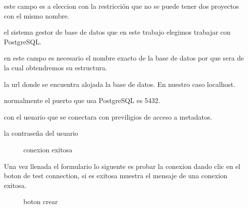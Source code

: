 \begin{description}[align=left]
\item [Nombre] este campo es a eleccion con la restricci\'on que no se puede tener dos proyectos con el mismo nombre.
\item [sgbd] el sistema gestor de base de datos que en este trabajo elegimos trabajar con PostgreSQL.
\item [base de datos] en este campo es necesario el nombre exacto de la base de datos por que sera de la cual obtendremos su estructura.
\item [host] la url donde se encuentra alojada la base de datos. En nuestro caso localhost.
\item [puerto] normalmente el puerto que usa PostgreSQL es 5432.
\item [usuario] con el usuario que se conectara con previligios de acceso a metadatos.
\item [password] la contrase\~na del usuario
\end{description}
\begin{figure}[H]

\caption{conexion exitosa} \label{fig:connectionsuccessfull}
\centering
{}
\end{figure}
Una vez llenada el formulario lo siguente es probar la conexion dando clic en el boton de test connection, si es exitosa muestra el mensaje de una conexion exitosa. 
\begin{figure}[H]
\caption{boton crear} \label{fig:createbutton}
\centering
{}
\end{figure}
